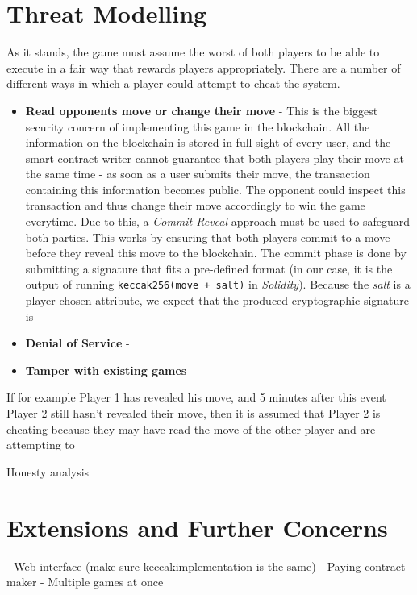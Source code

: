 \documentclass[a4paper, twoside]{article}
\begin{document}
\section{Threat Modelling}

As it stands, the game must assume the worst of both players to be able to execute in a fair way that rewards players appropriately. There are a number of different ways in which a player could attempt to cheat the system.

\begin{itemize}
	\item \textbf{Read opponents move or change their move} - This is the biggest security concern of implementing this game in the blockchain. All the information on the blockchain is stored in full sight of every user, and the smart contract writer cannot guarantee that both players play their move at the same time - as soon as a user submits their move, the transaction containing this information becomes public. The opponent could inspect this transaction and thus change their move accordingly to win the game everytime. Due to this, a \textit{Commit-Reveal} approach must be used to safeguard both parties. This works by ensuring that both players commit to a move before they reveal this move to the blockchain. The commit phase is done by submitting a signature that fits a pre-defined format (in our case, it is the output of running \texttt{keccak256(move + salt)} in \textit{Solidity}). Because the \textit{salt} is a player chosen attribute, we expect that the produced cryptographic signature is 
	
	\item \textbf{Denial of Service} - 
	
	\item \textbf{Tamper with existing games} - 
\end{itemize}



If for example Player 1 has revealed his move, and 5 minutes after this event Player 2 still hasn't revealed their move, then it is assumed that Player 2 is cheating because they may have read the move of the other player and are attempting to 

Honesty analysis

\section{Extensions and Further Concerns}
	- Web interface (make sure keccakimplementation is the same)
	- Paying contract maker
	- Multiple games at once
	
%






%
%

%
%


%
%
\end{document}
